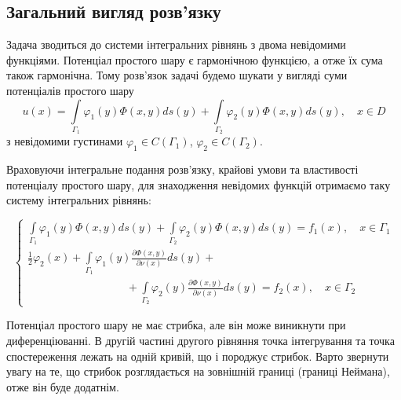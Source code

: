 \documentclass[14pt,a4paper]{extarticle}
\newcounter{e}
\newcommand{\intl}{\int\limits}
\begin{document}
 \subsection{Загальний вигляд розв'язку}
 Задача \boundprob \space зводиться до системи інтегральних рівнянь з двома невідомими функціями.
 Потенціал простого шару є гармонічною функцією, а отже їх сума також гармонічна.
 Тому розв'язок задачі \boundprob \space будемо шукати у вигляді суми потенціалів простого шару
 $$
 u(x) 
 = \intl_{\Gamma_1} \varphi_1(y) \Phi(x, y) d s(y)
 + \intl_{\Gamma_2} \varphi_2(y) \Phi(x, y) d s(y)
 , \quad x \in D
 $$
 з невідомими густинами $\varphi_1 \in C(\Gamma_{1}) $, $\varphi_2 \in C(\Gamma_{2})$.
 
 Враховуючи інтегральне подання розв'язку, крайові умови та властивості потенціалу простого шару, для знаходження невідомих функцій отримаємо таку систему інтегральних рівнянь:
 
 \begin{equation}
 	\label{IE-system}
	 \left\{
	 \begin{array}{l}
	 	\displaystyle
	 	  \intl_{\Gamma_{1}} \varphi_1(y) \Phi(x, y) d s(y)
	 	+ \intl_{\Gamma_{2}} \varphi_2(y) \Phi(x, y) d s(y)
	 	= f_{1}(x), \quad x \in \Gamma_{1} 
	 	\\ [1cm]
	 	\displaystyle
	 	\frac{1}{2}\varphi_2(x)
	 	+ \intl_{\Gamma_{1}} \varphi_1(y) \frac{\partial \Phi(x, y)}{\partial \nu(x)} d s(y) +
	 	\\ [0.3cm]
	 	\displaystyle \qquad \qquad \qquad \qquad \quad
	 	+ \intl_{\Gamma_{2}} \varphi_2(y) \frac{\partial \Phi(x, y)}{\partial \nu(x)} d s(y)
	 	= f_{2}(x), \quad x \in \Gamma_{2}
 \end{array}\right.
 \end{equation}

 Потенціал простого шару не має стрибка, але він може виникнути при диференціюванні. В другій частині другого рівняння точка інтегрування та точка спостереження лежать на одній кривій, що і породжує стрибок. Варто звернути увагу на те, що стрибок розглядається на зовнішній границі (границі Неймана), отже він буде додатнім.
 

\end{document}
